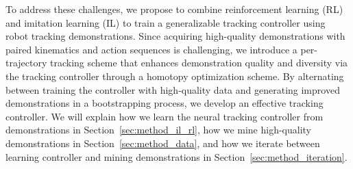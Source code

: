 


To address these challenges, we propose to combine reinforcement learning (RL) and imitation learning (IL) to train a generalizable tracking controller using robot tracking demonstrations. Since acquiring high-quality demonstrations with paired kinematics and action sequences is challenging, we introduce a per-trajectory tracking scheme that enhances demonstration quality and diversity via the tracking controller through a homotopy optimization scheme. 
By alternating between training the controller with high-quality data and generating improved demonstrations in a bootstrapping process, we develop an effective tracking controller.
We will explain how we learn the neural tracking controller from demonstrations in Section~\ref{sec:method_il_rl}, how we mine high-quality demonstrations in Section~\ref{sec:method_data}, and how we iterate between learning controller and mining demonstrations in Section~\ref{sec:method_iteration}. 



